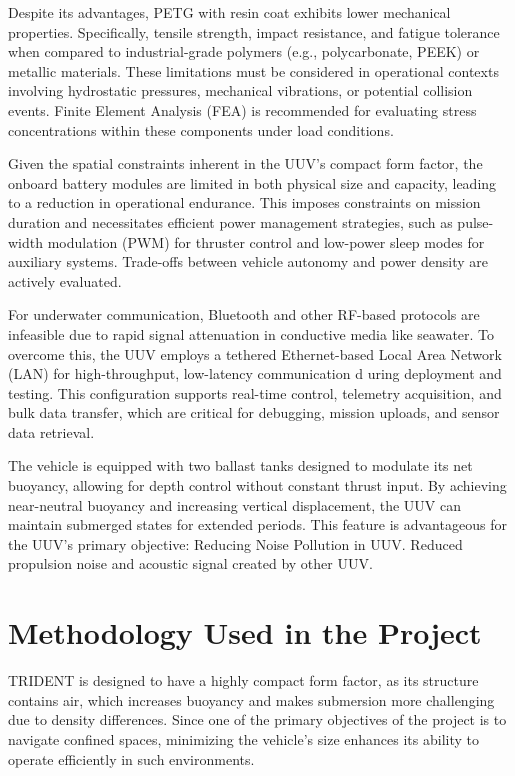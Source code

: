 Despite its advantages, PETG with resin coat exhibits lower mechanical 
properties. Specifically, tensile strength, impact resistance, and 
fatigue tolerance when compared to industrial-grade polymers (e.g., 
polycarbonate, PEEK) or metallic materials. These limitations must be 
considered in operational contexts involving hydrostatic pressures, 
mechanical vibrations, or potential collision events. Finite Element 
Analysis (FEA) is recommended for evaluating stress concentrations within 
these components under load conditions.

Given the spatial constraints inherent in the UUV’s compact form factor, 
the onboard battery modules are limited in both physical size and 
capacity, leading to a reduction in operational endurance. This imposes 
constraints on mission duration and necessitates efficient power 
management strategies, such as pulse-width modulation (PWM) for thruster 
control and low-power sleep modes for auxiliary systems. Trade-offs 
between vehicle autonomy and power density are actively evaluated.

For underwater communication, Bluetooth and other RF-based protocols are 
infeasible due to rapid signal attenuation in conductive media like 
seawater. To overcome this, the UUV employs a tethered Ethernet-based 
Local Area Network (LAN) for high-throughput, low-latency communication d
uring deployment and testing. This configuration supports real-time 
control, telemetry acquisition, and bulk data transfer, which are 
critical for debugging, mission uploads, and sensor data retrieval.

The vehicle is equipped with two ballast tanks designed to modulate its 
net buoyancy, allowing for depth control without constant thrust input. 
By achieving near-neutral buoyancy and increasing vertical displacement, 
the UUV can maintain submerged states for extended periods. This feature 
is advantageous for the UUV’s primary objective: Reducing Noise Pollution 
in UUV. Reduced propulsion noise and acoustic signal created by other UUV. 

\section{Methodology Used in the Project}

TRIDENT is designed to have a highly compact form factor, as its 
structure contains air, which increases buoyancy and makes submersion 
more challenging due to density differences. Since one of the primary 
objectives of the project is to navigate confined spaces, minimizing the 
vehicle's size enhances its ability to operate efficiently in such 
environments. 


